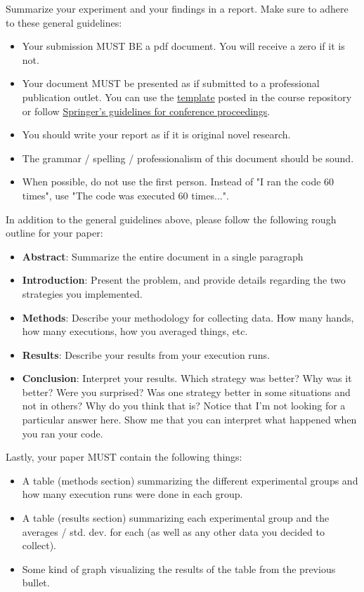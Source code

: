 \documentclass[paper=a4, fontsize=11pt, parskip=full]{scrartcl} %
\numberwithin{equation}{section} %
\numberwithin{figure}{section} %
\numberwithin{table}{section} %
\begin{document}
Summarize your experiment and your findings in a report. Make sure to adhere to these general guidelines:

\begin{itemize}
	\item Your submission MUST BE a pdf document. You will receive a zero if it is not.
	\item Your document MUST be presented as if submitted to a professional publication outlet. You can use the \href{https://github.com/markfloryan/dsa1/blob/master/labs/WordPaperTemplate.zip}{template} posted in the course repository or follow \href{https://www.springer.com/us/computer-science/lncs/conference-proceedings-guidelines}{Springer's guidelines for conference proceedings}.
	\item You should write your report as if it is original novel research.
	\item The grammar / spelling / professionalism of this document should be sound.
	\item When possible, do not use the first person. Instead of "I ran the code 60 times", use "The code was executed 60 times...".
\end{itemize}

In addition to the general guidelines above, please follow the following rough outline for your paper:

\begin{itemize}
	\item \textbf{Abstract}: Summarize the entire document in a single paragraph
	\item \textbf{Introduction}: Present the problem, and provide details regarding the two strategies you implemented.
	\item \textbf{Methods}: Describe your methodology for collecting data. How many hands, how many executions, how you averaged things, etc.
	\item \textbf{Results}: Describe your results from your execution runs.
	\item \textbf{Conclusion}: Interpret your results. Which strategy was better? Why was it better? Were you surprised? Was one strategy better in some situations and not in others? Why do you think that is? Notice that I'm not looking for a particular answer here. Show me that you can interpret what happened when you ran your code.
\end{itemize}

Lastly, your paper MUST contain the following things:

\begin{itemize}
	\item A table (methods section) summarizing the different experimental groups and how many execution runs were done in each group.
	\item A table (results section) summarizing each experimental group and the averages / std. dev. for each (as well as any other data you decided to collect).
	\item Some kind of graph visualizing the results of the table from the previous bullet.
\end{itemize}


\end{document}
